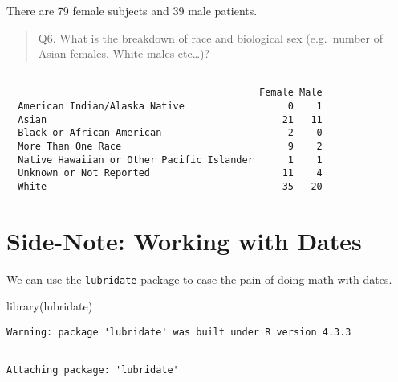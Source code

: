 \documentclass[
  letterpaper,
  DIV=11,
  numbers=noendperiod]{scrartcl}
\newenvironment{Shaded}{\begin{snugshade}}{\end{snugshade}}
\newcommand{\FunctionTok}[1]{\textcolor[rgb]{0.28,0.35,0.67}{#1}}
\newcommand{\NormalTok}[1]{\textcolor[rgb]{0.00,0.23,0.31}{#1}}
\newcommand{\SpecialCharTok}[1]{\textcolor[rgb]{0.37,0.37,0.37}{#1}}
\begin{document}
There are 79 female subjects and 39 male patients.

\begin{quote}
Q6. What is the breakdown of race and biological sex (e.g.~number of
Asian females, White males etc\ldots)?
\end{quote}

\begin{Shaded}
\end{Shaded}

\begin{verbatim}
                                           
                                            Female Male
  American Indian/Alaska Native                  0    1
  Asian                                         21   11
  Black or African American                      2    0
  More Than One Race                             9    2
  Native Hawaiian or Other Pacific Islander      1    1
  Unknown or Not Reported                       11    4
  White                                         35   20
\end{verbatim}

\hypertarget{side-note-working-with-dates}{%
\section{Side-Note: Working with
Dates}\label{side-note-working-with-dates}}

We can use the \texttt{lubridate} package to ease the pain of doing math
with dates.

\begin{Shaded}
\begin{Highlighting}[]
\FunctionTok{library}\NormalTok{(lubridate)}
\end{Highlighting}
\end{Shaded}

\begin{verbatim}
Warning: package 'lubridate' was built under R version 4.3.3
\end{verbatim}

\begin{verbatim}

Attaching package: 'lubridate'
\end{verbatim}
\end{document}
